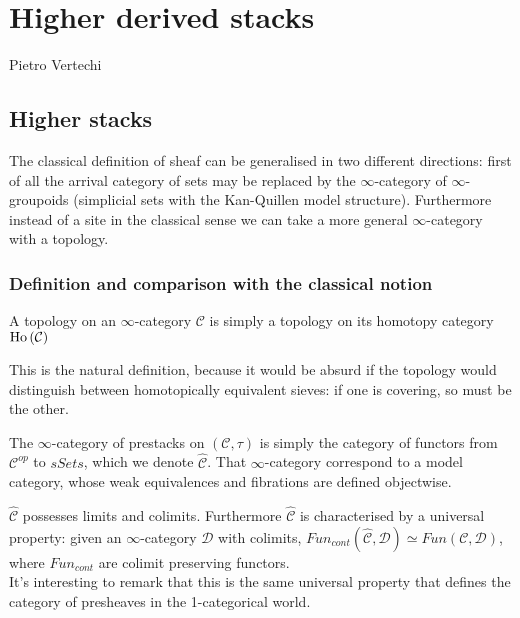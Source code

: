 \chapter{Higher derived stacks}

\begin{refsection}

\begin{flushright}
Pietro Vertechi
\end{flushright}

\section{Higher stacks}

The classical definition of sheaf can be generalised in two different directions: first of all the arrival category of sets may be replaced by the 
$\infty$-category of $\infty$-groupoids (simplicial sets with the Kan-Quillen model structure). Furthermore instead of a site in the classical sense we can 
take a more general $\infty$-category with a topology.\\
\subsection{Definition and comparison with the classical notion}
\begin{defin}
A topology on an $\infty$-category $\mathcal C$ is simply a topology on its homotopy category $\mathrm{Ho} \,(\mathcal C)$
\end{defin}

\begin{rmk}
This is the natural definition, because it would be absurd if the topology would distinguish between homotopically equivalent sieves: if one is covering, so must be the other.
\end{rmk}


The $\infty$-category of prestacks on $(\mathcal C,\tau)$ is simply the category of functors from $\mathcal C^{op}$ to $sSets$, which we denote $\hat{\mathcal C}$.
That $\infty$-category correspond to a model category, whose weak equivalences and fibrations are defined objectwise.\\

\begin{rmk} $\hat{\mathcal C}$ possesses limits and colimits. Furthermore
$\hat{\mathcal C}$ is characterised by a universal property: given an $\infty$-category $\mathcal D$ with colimits, $Fun_{cont}(\hat{\mathcal C}, \mathcal D)\simeq Fun(\mathcal C,\mathcal D)$, where
$Fun_{cont}$ are colimit preserving functors.\\
It's interesting to remark that this is the same universal property that defines the category of presheaves in the 1-categorical world.
\end{rmk}


\end{refsection}
